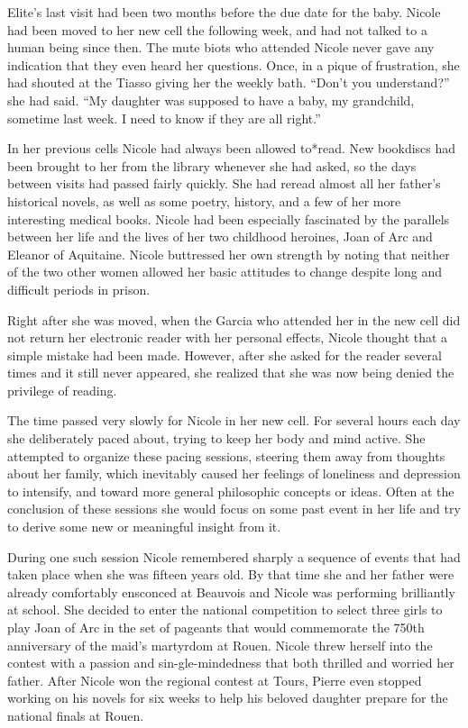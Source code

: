 \documentclass[]{article}
\begin{document}
{{Elite’s last visit had been two months before the due date for the baby. Nicole had been moved to her new cell the following week, and had not talked to a human being since then. The mute biots who attended Nicole never gave any indication that they even heard her questions. Once, in a pique of frustration, she had shouted at the Tiasso giving her the weekly bath. “Don’t you understand?” she had said. “My daughter was supposed to have a baby, my grandchild, sometime last week. I need to know if they are all right.”

In her previous cells Nicole had always been allowed to*read. New bookdiscs had been brought to her from the library whenever she had asked, so the days between visits had passed fairly quickly. She had reread almost all her father’s historical novels, as well as some poetry, history, and a few of her more interesting medical books. Nicole had been especially fascinated by the parallels between her life and the lives of her two childhood heroines, Joan of Arc and Eleanor of Aquitaine. Nicole buttressed her own strength by noting that neither of the two other women allowed her basic attitudes to change despite long and difficult periods in prison.

Right after she was moved, when the Garcia who attended her in the new cell did not return her electronic reader with her personal effects, Nicole thought that a simple mistake had been made. However, after she asked for the reader several times and it still never appeared, she realized that she was now being denied the privilege of reading.

The time passed very slowly for Nicole in her new cell. For several hours each day she deliberately paced about, trying to keep her body and mind active. She attempted to organize these pacing sessions, steering them away from thoughts about her family, which inevitably caused her feelings of loneliness and depression to intensify, and toward more general philosophic concepts or ideas. Often at the conclusion of these sessions she would focus on some past event in her life and try to derive some new or meaningful insight from it.

During one such session Nicole remembered sharply a sequence of events that had taken place when she was fifteen years old. By that time she and her father were already comfortably ensconced at Beauvois and Nicole was performing brilliantly at school. She decided to enter the national competition to select three girls to play Joan of Arc in the set of pageants that would commemorate the 750th anniversary of the maid’s martyrdom at Rouen. Nicole threw herself into the contest with a passion and sin-gle-mindedness that both thrilled and worried her father. After Nicole won the regional contest at Tours, Pierre even stopped working on his novels for six weeks to help his beloved daughter prepare for the national finals at Rouen.

}}
\end{document}
